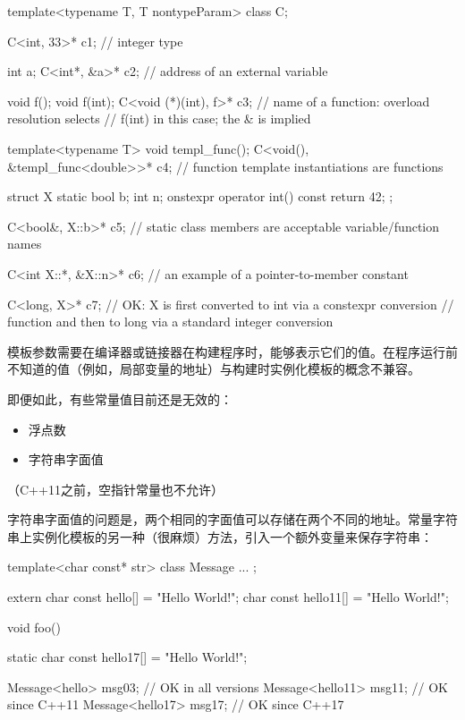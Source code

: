 \begin{cpp}
template<typename T, T nontypeParam>
class C;

C<int, 33>* c1; // integer type

int a;
C<int*, &a>* c2; // address of an external variable

void f();
void f(int);
C<void (*)(int), f>* c3; // name of a function: overload resolution selects
						// f(int) in this case; the & is implied

template<typename T> void templ_func();
C<void(), &templ_func<double>>* c4; // function template instantiations are functions

struct X {
	static bool b;
	int n;
	onstexpr operator int() const { return 42; }
};

C<bool&, X::b>* c5; // static class members are acceptable variable/function names

C<int X::*, &X::n>* c6; // an example of a pointer-to-member constant

C<long, X{}>* c7; // OK: X is first converted to int via a constexpr conversion
// function and then to long via a standard integer conversion
\end{cpp}

模板参数需要在编译器或链接器在构建程序时，能够表示它们的值。在程序运行前不知道的值（例如，局部变量的地址）与构建时实例化模板的概念不兼容。

即便如此，有些常量值目前还是无效的：

\begin{itemize}
\item 
浮点数

\item 
字符串字面值
\end{itemize}

（C++11之前，空指针常量也不允许）

字符串字面值的问题是，两个相同的字面值可以存储在两个不同的地址。常量字符串上实例化模板的另一种（很麻烦）方法，引入一个额外变量来保存字符串：

\begin{cpp}
template<char const* str>
class Message {
	...
};

extern char const hello[] = "Hello World!";
char const hello11[] = "Hello World!";

void foo() {
	static char const hello17[] = "Hello World!";
	
	Message<hello> msg03; // OK in all versions
	Message<hello11> msg11; // OK since C++11
	Message<hello17> msg17; // OK since C++17
}
\end{cpp}

